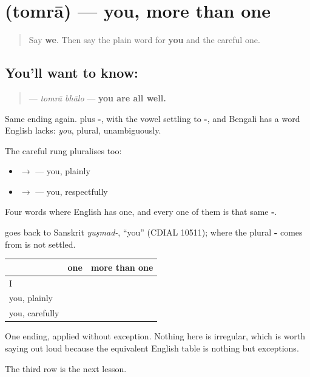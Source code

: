 \section[\texorpdfstring{\bn{তোমরা} (tomrā)}{তোমরা (tomrā)}]{ (tomrā) — you, more than one}

\label{lesson:BN-C24-tomra}



\begin{quote}
Say \textbf{we}. Then say the plain word for \textbf{you} and the careful one.
\end{quote}

\subsection*{You'll want to know: }
\begin{quote}
\textbf{ } — \emph{tomrā bhālo} — \textbf{you are all well.}
\end{quote}

Same ending again. \textbf{} plus \textbf{-}, with the vowel settling to \textbf{-}, and Bengali has a word English lacks: \emph{you}, plural, unambiguously.

The careful rung pluralises too:

\begin{itemize}
\raggedright
  \item \textbf{} $\to$ \textbf{} — you, plainly
  \item \textbf{} $\to$ \textbf{} — you, respectfully
\end{itemize}

Four words where English has one, and every one of them is that same \textbf{-}.

\begin{cousinweb}
\textbf{} goes back to Sanskrit \emph{yuṣmad-}, \textquotedblleft{}you\textquotedblright{} (CDIAL 10511); where the plural \textbf{-} comes from is not settled.
\end{cousinweb}

\begin{grammarlens}[title={Grammar Lens: the grid, complete for two of three persons}]
\noindent
\begin{tabularx}{\linewidth}{@{}>{\raggedright\arraybackslash}X>{\raggedright\arraybackslash}X>{\raggedright\arraybackslash}X@{}}
\toprule
\textbf{} & \textbf{one} & \textbf{more than one} \\
\midrule
I & \textbf{\bn{আমি}} & \textbf{\bn{আমরা}} \\
you, plainly & \textbf{\bn{তুমি}} & \textbf{\bn{তোমরা}} \\
you, carefully & \textbf{\bn{আপনি}} & \textbf{\bn{আপনারা}} \\
\bottomrule
\end{tabularx}

One ending, applied without exception. Nothing here is irregular, which is worth saying out loud because the equivalent English table is nothing but exceptions.

The third row is the next lesson.
\end{grammarlens}

